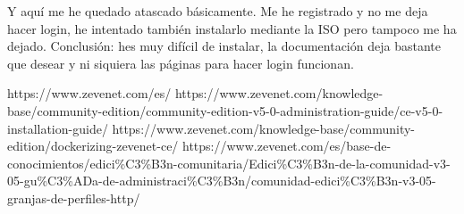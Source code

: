 \documentclass[12pt]{article}
\begin{document}
Y aquí me he quedado atascado básicamente. Me he registrado y no me deja hacer login, he intentado también instalarlo mediante la ISO pero tampoco me ha dejado. Conclusión: hes muy difícil de instalar, la documentación deja bastante que desear y ni siquiera las páginas para hacer login funcionan.

\begin{thebibliography}{9}
https://www.zevenet.com/es/
https://www.zevenet.com/knowledge-base/community-edition/community-edition-v5-0-administration-guide/ce-v5-0-installation-guide/
https://www.zevenet.com/knowledge-base/community-edition/dockerizing-zevenet-ce/
https://www.zevenet.com/es/base-de-conocimientos/edici\%C3\%B3n-comunitaria/Edici\%C3\%B3n-de-la-comunidad-v3-05-gu\%C3\%ADa-de-administraci\%C3\%B3n/comunidad-edici\%C3\%B3n-v3-05-granjas-de-perfiles-http/
\end{thebibliography}

\end{document}

